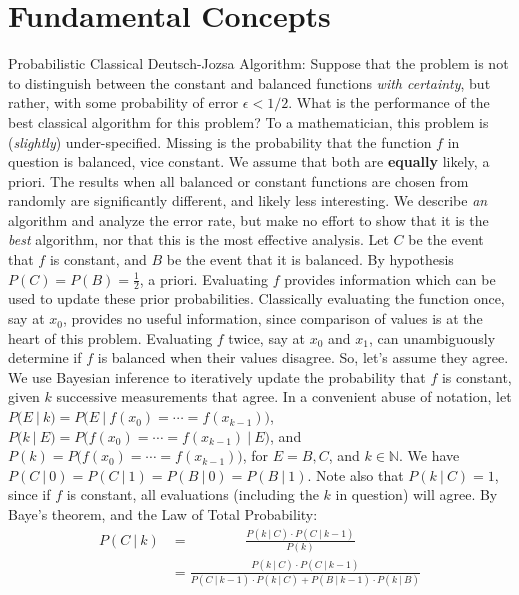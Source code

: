 
\chapter{Fundamental Concepts}
 Probabilistic Classical Deutsch-Jozsa Algorithm: Suppose that the problem is not to distinguish between the constant and balanced functions \textit{with certainty}, but rather, with some probability of error $\epsilon < 1/2$.  What is the performance of the best classical algorithm for this problem?
\Soln  To a mathematician, this problem is (\textit{slightly}) under-specified.  Missing is the probability that the function $f$ in question is balanced, vice constant.  We assume that both are \textbf{equally} likely, a priori.  The results when all balanced or constant functions are chosen from randomly are significantly different, and likely less interesting.
We describe \textit{an} algorithm and analyze the error rate, but make no effort to show that it is the \textit{best} algorithm, nor that this is the most effective analysis. Let $C$ be the event that $f$ is constant, and $B$ be the event that it is balanced.  By hypothesis $P(C)=P(B)=\frac12$, a  priori.  Evaluating $f$ provides information which can be used to update these prior probabilities.  Classically evaluating the function once, say at $x_0$, provides no useful information, since comparison of values is at the heart of this problem.  Evaluating $f$ twice, say at $x_0$ and $x_1$, can unambiguously determine if $f$ is balanced when their values disagree.  So, let's assume they agree.  We use Bayesian inference to iteratively update the probability that $f$ is constant, given $k$ successive measurements that agree.  In a convenient abuse of notation, let $P(E\ |\ k) = P\bigl(E\ |\ f(x_0) = \cdots = f(x_{k-1})\bigr)$, $P(k\ |\ E) = P\bigl(f(x_0) = \cdots = f(x_{k-1})\ |\ E\bigr)$, and $P(k) =  P\bigl(f(x_0) = \cdots = f(x_{k-1})\bigr)$, for $E=B,C$, and $k\in\mathbb{N}$.  We have $P(C\ |\ 0)=P(C\ |\ 1)=P(B\ |\ 0)=P(B\ |\ 1)$.  Note also that $P(k\ |\ C) = 1$, since if $f$ is constant, all evaluations (including the $k$ in question) will agree.
By Baye's theorem, and the Law of Total Probability:
\begin{align*}
P(C\ |\  k)&=\ \ \ \ \ \ \ \ \ \ \ \ \ \ \ \ \ \ \frac{P(k\ |\  C)\cdot P(C\ |\ k-1)}{P(k)} \\
&=\frac{P(k\ |\ C)\cdot P(C\ |\ k-1)}{ P(C\ |\ k-1) \cdot P(k\ |\ C) +  P(B\ |\ k-1) \cdot P(k\ |\ B)}
\end{align*}

